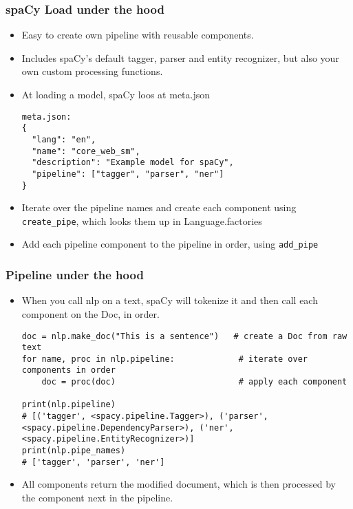 \begin{frame}[fragile]\frametitle{spaCy Load under the hood}
  \begin{itemize}
    \item Easy to create own pipeline with reusable components.
		\item Includes spaCy’s default tagger, parser and entity recognizer, but also your own custom processing functions.
		\item At loading a model, spaCy loos at meta.json
		\begin{lstlisting}
meta.json:
{
  "lang": "en",
  "name": "core_web_sm",
  "description": "Example model for spaCy",
  "pipeline": ["tagger", "parser", "ner"]
}
\end{lstlisting}

\item Iterate over the pipeline names and create each component using \lstinline|create_pipe|, which looks them up in Language.factories
\item Add each pipeline component to the pipeline in order, using \lstinline|add_pipe|

  \end{itemize}
	
	
\end{frame}

\begin{frame}[fragile]\frametitle{Pipeline under the hood}
  \begin{itemize}
    \item When you call nlp on a text, spaCy will tokenize it and then call each component on the Doc, in order.
		\begin{lstlisting}
doc = nlp.make_doc("This is a sentence")   # create a Doc from raw text
for name, proc in nlp.pipeline:             # iterate over components in order
    doc = proc(doc)                         # apply each component

print(nlp.pipeline)
# [('tagger', <spacy.pipeline.Tagger>), ('parser', <spacy.pipeline.DependencyParser>), ('ner', <spacy.pipeline.EntityRecognizer>)]
print(nlp.pipe_names)
# ['tagger', 'parser', 'ner']
\end{lstlisting}

\item All components return the modified document, which is then processed by the component next in the pipeline.

  \end{itemize}
	
	
\end{frame}

